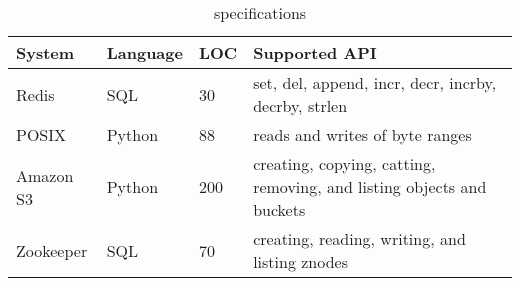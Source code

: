 \begin{table}[t]
  \caption{\fluent{} \watprovenance{} specifications}
  \begin{tabular}{lllp{3cm}}
    \toprule
    System    & Language & LOC & Supported API                                                         \\\midrule
    Redis     & SQL      & 30  & set, del, append, incr, decr, incrby, decrby, strlen                  \\
    POSIX     & Python   & 88  & reads and writes of byte ranges                                       \\
    Amazon S3 & Python   & 200 & creating, copying, catting, removing, and listing objects and buckets \\
    Zookeeper & SQL      & 70  & creating, reading, writing, and listing znodes                        \\
    \bottomrule
  \end{tabular}
\end{table}
